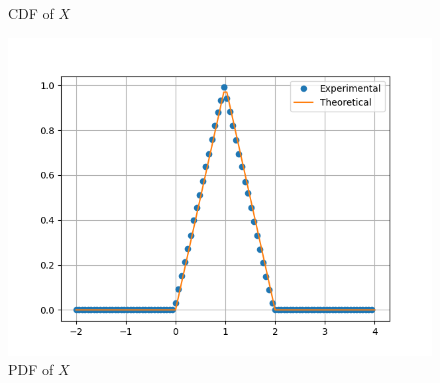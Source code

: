 \documentclass[journal, 12pt, twocolumn]{IEEEtran}
\begin{document}
\begin{enumerate}[label=\arabic{section}.\arabic*]
\begin{figure}[!ht]
            \caption{CDF of $X$}
            \label{fig:cdf_tri}
        \end{figure}
        \begin{figure}[!ht]
            \includegraphics[width=\columnwidth]{figs/pdf_tri.png}
            \caption{PDF of $X$}
            \label{fig:pdf_tri}
        \end{figure}

\end{enumerate}
\end{document}
